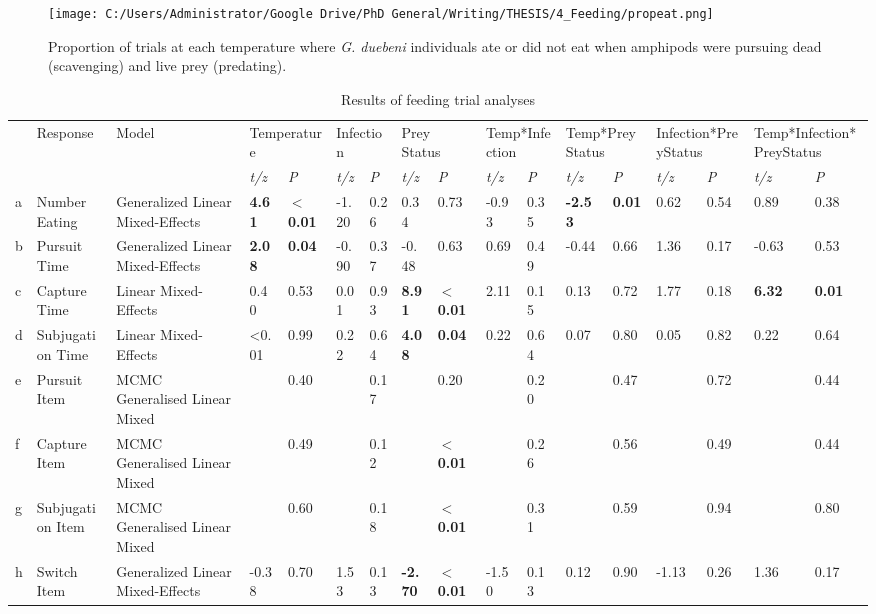 \begin{figure}%
    \centering
    \texttt{[image: C:/Users/Administrator/Google Drive/PhD General/Writing/THESIS/4\_Feeding/propeat.png]}
  \caption [Proportion of \emph{G. duebeni} eating]{Proportion of trials at each temperature where \emph{G. duebeni} individuals ate or did not eat when amphipods were pursuing dead (scavenging) and live prey (predating).} 
    \label{fig:propeat}
\end{figure}

\begin{landscape}
\begin{table}
\caption[Effects of temperature, infection and prey status on \emph{G. duebeni} feeding behaviour. Significant (\emph{P} $<$ 0.05) effects are highlighted in bold.]{Results of feeding trial analyses}
\label{tab:feedtab}
\begin{tabular}{lllllllllllllllll}
 & Response & Model & \multicolumn{2}{l}{Temperature} & \multicolumn{2}{l}{Infection} & \multicolumn{2}{l}{Prey Status} & \multicolumn{2}{l}{Temp*Infection} & \multicolumn{2}{l}{Temp*Prey Status} & \multicolumn{2}{l}{Infection*PreyStatus} & \multicolumn{2}{l}{Temp*Infection*PreyStatus} \\
 &  &  & \emph{t/z} & \emph{P} &\emph{t/z} & \emph{P} & \emph{t/z} & \emph{P} & \emph{t/z} & \emph{P} & \emph{t/z} & \emph{P} & \emph{t/z} & \emph{P} & \emph{t/z} & \emph{P} \\
a & Number Eating & Generalized Linear Mixed-Effects & \textbf{4.61} & \textbf{$<$0.01} & -1.20 & 0.26 & 0.34 & 0.73 & -0.93 & 0.35 & \textbf{-2.53} & \textbf{0.01} & 0.62 & 0.54 & 0.89 & 0.38 \\
b & Pursuit Time & Generalized Linear Mixed-Effects & \textbf{2.08} & \textbf{0.04} & -0.90 & 0.37 & -0.48 & 0.63 & 0.69 & 0.49 & -0.44 & 0.66 & 1.36 & 0.17 & -0.63 & 0.53 \\
c & Capture Time & Linear Mixed-Effects & 0.40 & 0.53 & 0.01 & 0.93 & \textbf{8.91} & \textbf{$<$0.01} & 2.11 & 0.15 & 0.13 & 0.72 & 1.77 & 0.18 & \textbf{6.32} & \textbf{0.01} \\
d & Subjugation Time & Linear Mixed-Effects & <0.01 & 0.99 & 0.22 & 0.64 & \textbf{4.08} & \textbf{0.04} & 0.22 & 0.64 & 0.07 & 0.80 & 0.05 & 0.82 & 0.22 & 0.64 \\
e & Pursuit Item & MCMC Generalised Linear Mixed &  & 0.40 &  & 0.17 &  & 0.20 &  & 0.20 &  & 0.47 &  & 0.72 &  & 0.44 \\
f & Capture Item & MCMC Generalised Linear Mixed &  & 0.49 &  & 0.12 &  & \textbf{$<$0.01} &  & 0.26 &  & 0.56 &  & 0.49 &  & 0.44 \\
g & Subjugation Item & MCMC Generalised Linear Mixed &  & 0.60 &  & 0.18 &  & \textbf{$<$0.01} &  & 0.31 &  & 0.59 &  & 0.94 &  & 0.80 \\
h & Switch Item & Generalized Linear Mixed-Effects & -0.38 & 0.70 & 1.53 & 0.13 & \textbf{-2.70} & \textbf{$<$0.01} & -1.50 & 0.13 & 0.12 & 0.90 & -1.13 & 0.26 & 1.36 & 0.17
\end{tabular}
\end{table}
\end{landscape}

